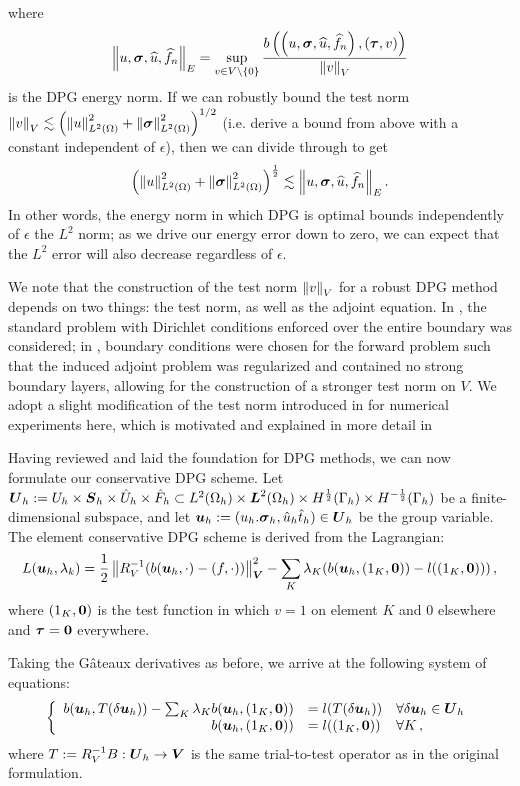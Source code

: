\documentclass[Proposal.tex]{subfiles}
\begin{document}
where
\[
\left\| u,\boldsymbol\sigma,\widehat{u},\widehat{f}_n \right\|_E = \sup_{v\in
V\setminus\left\{ 0 \right\}}\frac{b\left( \left( u,\boldsymbol\sigma,\widehat{u},\widehat{f}_n \right),\left( \boldsymbol\tau,v \right) \right)}{\left\| v \right\|_V}
\]
is the DPG energy norm.  If we can robustly bound the test norm $\left\| v \right\|_V
\lesssim \left( \left\| u \right\|_{L^2\left( \Omega \right)}^2+\left\| \boldsymbol\sigma \right\|^2_{L^2\left( \Omega \right)} \right)^{1/2}$ (i.e. derive a
bound from above with a constant independent of $\epsilon$), then we can
divide through to get
\begin{equation}
\left( \left\| u \right\|_{L^2\left( \Omega \right)}^2 + \left\| \boldsymbol\sigma \right\|_{L^2\left( \Omega \right)}^2 \right)^{\frac{1}{2}} \lesssim
\left\| u,\boldsymbol\sigma,\widehat{u},\widehat{f}_n \right\|_E.
\label{eq:robustBound}
\end{equation}
In other words, the energy norm in which DPG is optimal bounds independently
of $\epsilon$ the $L^2$ norm; as we drive our energy error down to zero, we
can expect that the $L^2$ error will also decrease regardless of $\epsilon$.

We note that the construction of the test norm $\left\| v \right\|_V$ for a robust DPG
method depends on two things: the test norm, as well as the adjoint equation.
In \cite{DemkowiczHeuer}, the standard problem with Dirichlet conditions
enforced over the entire boundary was considered; in
\cite{ChanHeuerThanhDemkowicz2012}, boundary conditions were chosen for the
forward problem such that the induced adjoint problem was regularized and
contained no strong boundary layers, allowing for the construction of a
stronger test norm on $V$.  We adopt a slight modification of the test norm
introduced in \cite{ChanHeuerThanhDemkowicz2012} for numerical experiments
here, which is motivated and explained in more detail in


Having reviewed and laid the foundation for DPG methods, we can now formulate our conservative DPG scheme.  %
Let $\boldsymbol{U}_h:=U_h\times\boldsymbol{S}_h\times\hat U_h\times\hat F_h\subset L^2(\Omega_h)\times\boldsymbol{L}^2(\Omega_h)\times H^{\frac{1}{2}}(\Gamma_h)\times H^{-\frac{1}{2}}(\Gamma_h)$
be a finite-dimensional subspace, and let $\boldsymbol{u}_h:=(u_h.\boldsymbol\sigma_h,\hat
u_h\hat t_h)\in\boldsymbol{U}_h$ be the group variable. The element conservative DPG scheme is
derived from the Lagrangian:
\begin{equation}
L(\boldsymbol{u}_h,\lambda_k)=\frac{1}{2}\left\| R_V^{-1}(b(\boldsymbol{u}_h,\cdot)-(f,\cdot)) \right\|^2_{\boldsymbol{V}}-\sum_K\lambda_K(b(\boldsymbol{u}_h,(1_K,\boldsymbol{0}))-l((1_K,\boldsymbol{0})))\,,
\label{eq:lagrangian}
\end{equation}
where $(1_K,\boldsymbol{0})$ is the test function in which $v=1$ on element $K$ and 0 elsewhere and $\boldsymbol\tau=\boldsymbol{0}$ everywhere.

Taking the G\^ateaux derivatives as before, we arrive at the following system
of equations:
\begin{equation}
\left\{
\begin{array}[c]{rll}
b(\boldsymbol{u}_h,T(\delta\boldsymbol{u}_h))-\sum_K\lambda_K b(\boldsymbol{u}_h,(1_K,\boldsymbol{0}))
&=l(T(\delta\boldsymbol{u}_h)) & \forall\delta\boldsymbol{u}_h\in\boldsymbol{U}_h\\
b(\boldsymbol{u}_h,(1_K,\boldsymbol{0})) &=l((1_K,\boldsymbol{0})) & \forall K\,,
\end{array}
\right.
\label{eq:conservativeSystem}
\end{equation}
where $T:=R_V^{-1}B:\boldsymbol{U}_h\rightarrow\boldsymbol{V}$ is the same trial-to-test operator as in the original formulation.
\end{document}
